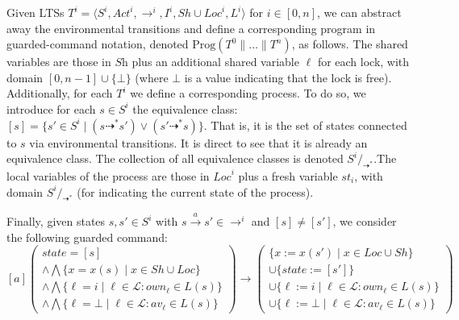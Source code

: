 	Given LTSs $T^i = \langle \mathit{S}^i, \mathit{Act}^i, \rightarrow^i,I^i, \mathit{Sh}\cup \mathit{Loc}^i, L^i \rangle$ for $i \in [0,n]$, we can abstract away the environmental transitions and define a corresponding program in  guarded-command notation,  denoted $\text{Prog}(T^0  \parallel \dots \parallel T^{n})$, as follows. The shared variables are those in $\textit{Sh}$ plus an additional shared variable $\ell$ for each lock, with domain $[0,n-1]\cup\{\bot\}$ (where $\bot$ is a value indicating that the lock is free). Additionally, for each $T^i$ we define a corresponding process. To do so, we introduce for each $s \in S^i$  the equivalence class: $[ s ]  = \{ s' \in S^i \mid (s \dashrightarrow^* s') \vee (s'  \dashrightarrow^* s)\}$. 
That is, it is the set of states connected to $s$ via environmental transitions. It is direct to see that it is already an equivalence class. The collection of all equivalence classes
is denoted $S^i /_{\dashrightarrow^*}$.The local variables of the process are those in $\textit{Loc}^i$ plus a fresh variable $\textit{st}_i$, with domain $S^i/_{\dashrightarrow^*}$ (for indicating the current state of the process). 

Finally, given states $s,s' \in S^i$ with $s \xrightarrow{a} s' \in \rightarrow^i$ and  $[s] \neq [s']$, we consider the following  guarded command:
\[
 [a] \left( \begin{array}{l} 
 			 state = [s] \\
			 \wedge \bigwedge \{x = x(s) \mid x \in \mathit{Sh} \cup \mathit{Loc} \}\\ 
			\wedge \bigwedge \{ \ell = i \mid \ell \in \mathcal{L} : \mathit{own}_\ell \in L(s)\}	 \\ 
			 \wedge \bigwedge \{ \ell = \bot \mid \ell \in \mathcal{L} : \mathit{av}_\ell \in L(s)\}  \end{array} \right) \rightarrow \left( \begin{array}{l} 
 																					  			  \{x {:=} x(s')  \mid x \in \mathit{Loc}\cup \mathit{Sh}\} \\ 
																					 			  \cup \{\mathit{state} {:=} [s'] \} \\
																								  \cup \{ \ell := i \mid \ell \in \mathcal{L} : \mathit{own}_\ell \in L(s)\}  \\
																								  \cup \{ \ell := \bot \mid \ell \in \mathcal{L} : \mathit{av}_\ell \in L(s)\}
																					  \end{array} \right)
\]

